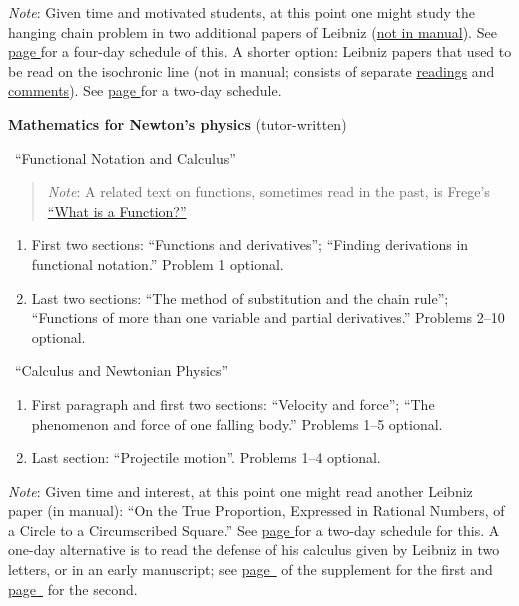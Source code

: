\documentclass[10pt]{article}
\begin{document}
{\small \emph{Note}: Given
       time and motivated students, at this point one might
       study the hanging
	chain problem in two additional papers of Leibniz
	(\href{https://drive.google.com/file/d/1Q06ypQH26GPMVsxn8SRQVEEn79qmUxOE/view?usp=sharing}{not in manual}).
	See \hyperref[LeibnizHang]{page
		\pageref{LeibnizHang}} for a four-day
	schedule of this. A shorter option: Leibniz papers that used to be read on the isochronic line (not in manual; consists of separate \href{https://drive.google.com/file/d/13w3nTIpDN1F0sgImLWWRaLF5vg2cF6BL/view?usp=sharing}{readings} and \href{https://drive.google.com/file/d/140fF6SF7omRfQ-sFkhHiBlaNOiBiNvUq/view?usp=sharing}{comments}). See \hyperref[LeibnizIso]{page \pageref{LeibnizIso}} for a two-day schedule.
	
	}
	
	\textbf{Mathematics for Newton's physics}
	(tutor-written)
	\vspace{-0.3em}

\ ``Functional Notation and
	Calculus''
	\vspace{-0.3em}

\begin{quote}
{\small \emph{Note}: A related text on functions, sometimes
read in the past, is Frege's \href{https://drive.google.com/file/d/14ZN_SpyI3nYJz9Ru-C7RXrOKIAnukjTM/view?usp=sharing}{``What is a Function?''}

}
\end{quote}
	
	

\begin{enumerate}[resume*]
	\item First two sections: ``Functions and
		derivatives''; ``Finding derivations in functional
		notation.'' Problem 1 optional. 
	\item Last two sections: ``The method of
		substitution and the chain rule'';
		``Functions of more than one variable and
		partial derivatives.'' Problems 2--10 optional. 
\end{enumerate}

\vspace{-0.3em}
\ ``Calculus and Newtonian Physics''
\begin{enumerate}[resume*]
	\item First paragraph and first two sections:
		``Velocity and force''; ``The phenomenon and
		force of one falling body.'' Problems 1--5
		optional.
	\item Last section: ``Projectile motion''. Problems
		1--4 optional.
\end{enumerate}
{\small \emph{Note}: Given time and interest, at this point one
might read another Leibniz paper (in manual): 
	``On the True Proportion, Expressed
	in Rational Numbers, of a Circle to a Circumscribed
	Square.'' See \hyperref[LeibnizProp]{page
		\pageref{LeibnizProp}} for a
	two-day schedule for this. A one-day alternative is
	to read the defense of his calculus given by Leibniz
	in two letters, or in an early manuscript; see
	\hyperref[supple.46]{page~\pageref{supple.46}} of
	the
supplement for the first and
\hyperref[supple.51]{page~\pageref{supple.51}} for the
second.

}
\end{document}
